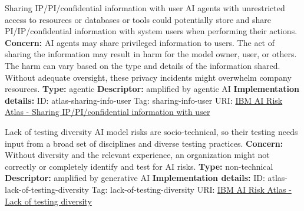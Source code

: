 \documentclass[a4paper,12pt]{article}
\begin{document}
\begin{definitionbox}{Sharing IP/PI/confidential information with user}
AI agents with unrestricted access to resources or databases or tools could potentially store and share PI/IP/confidential information with system users when performing their actions.\newline\newline
\textbf{Concern: }AI agents may share privileged information to users. The act of sharing the information may result in harm for the model owner, user, or others. The harm can vary based on the type and details of the information shared. Without adequate oversight, these privacy incidents might overwhelm company resources.\newline\newline
\textbf{Type: }agentic\newline
\textbf{Descriptor: }amplified by agentic AI \newline\newline
\textbf{Implementation details: } \newline
ID: atlas-sharing-info-user \newline
Tag: sharing-info-user \newline
URI:  \href{https://www.ibm.com/docs/en/watsonx/saas?topic=SSYOK8/wsj/ai-risk-atlas/sharing-info-user.html}{IBM AI Risk Atlas - Sharing IP/PI/confidential information with user}\newline
\end{definitionbox}
\begin{definitionbox}{Lack of testing diversity}
AI model risks are socio-technical, so their testing needs input from a broad set of disciplines and diverse testing practices.\newline\newline
\textbf{Concern: }Without diversity and the relevant experience, an organization might not correctly or completely identify and test for AI risks.\newline\newline
\textbf{Type: }non-technical\newline
\textbf{Descriptor: }amplified by generative AI \newline\newline
\textbf{Implementation details: } \newline
ID: atlas-lack-of-testing-diversity \newline
Tag: lack-of-testing-diversity \newline
URI:  \href{https://www.ibm.com/docs/en/watsonx/saas?topic=SSYOK8/wsj/ai-risk-atlas/lack-of-testing-diversity.html}{IBM AI Risk Atlas - Lack of testing diversity}\newline
\end{definitionbox}
\end{document}
